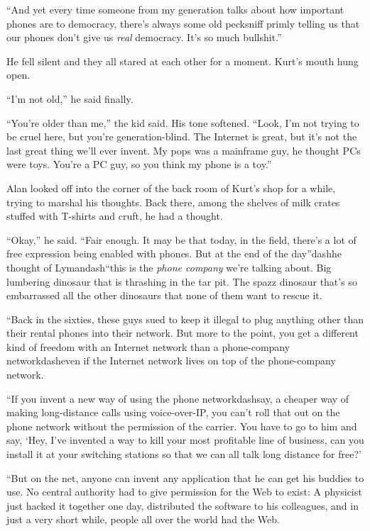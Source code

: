 ``And yet every time someone from my generation talks about how
important phones are to democracy, there's always some old pecksniff
primly telling us that our phones don't give us \textit{real}
democracy.  It's so much bullshit.''

He fell silent and they all stared at each other for a moment.  Kurt's
mouth hung open.

``I'm not old,'' he said finally.

``You're older than me,'' the kid said.  His tone softened.  ``Look,
I'm not trying to be cruel here, but you're generation-blind.  The
Internet is great, but it's not the last great thing we'll ever
invent.  My pops was a mainframe guy, he thought PCs were toys. 
You're a PC guy, so you think my phone is a toy.''

Alan looked off into the corner of the back room of Kurt's shop for a
while, trying to marshal his thoughts.  Back there, among the shelves
of milk crates stuffed with T-shirts and cruft, he had a thought.

``Okay,'' he said.  ``Fair enough.  It may be that today, in the
field, there's a lot of free expression being enabled with phones. 
But at the end of the day''dash{}he thought of Lymandash{}``this is the
\textit{phone company} we're talking about.  Big lumbering dinosaur
that is thrashing in the tar pit.  The spazz dinosaur that's so
embarrassed all the other dinosaurs that none of them want to rescue
it.

``Back in the sixties, these guys sued to keep it illegal to plug
anything other than their rental phones into their network.  But more
to the point, you get a different kind of freedom with an Internet
network than a phone-company networkdash{}even if the Internet network
lives on top of the phone-company network.

``If you invent a new way of using the phone networkdash{}say, a cheaper
way of making long-distance calls using voice-over-IP, you can't roll
that out on the phone network without the permission of the carrier. 
You have to go to him and say, `Hey, I've invented a way to kill your
most profitable line of business, can you install it at your switching
stations so that we can all talk long distance for free?'

``But on the net, anyone can invent any application that he can get
his buddies to use.  No central authority had to give permission for
the Web to exist:  A physicist just hacked it together one day,
distributed the software to his colleagues, and in just a very short
while, people all over the world had the Web.

